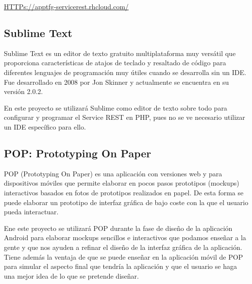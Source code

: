 	\url{HTTPs://apptfg-servicerest.rhcloud.com/}    
    
    \subsection{Sublime Text}\label{ssec:sublime}
    
    Sublime Text \cite{ref:sublime} es un editor de texto gratuito multiplataforma muy versátil que proporciona características de atajos de teclado y resaltado de código para diferentes lenguajes de programación muy útiles cuando se desarrolla sin un IDE. Fue desarrollado en 2008 por Jon Skinner y actualmente se encuentra en su versión 2.0.2.
    
    En este proyecto se utilizará Sublime como editor de texto sobre todo para configurar y programar el Service REST en PHP, pues no se ve necesario utilizar un IDE específico para ello.
    
    \subsection{POP: Prototyping On Paper}\label{ssec:pop}
    
    POP \cite{ref:pop} (Prototyping On Paper) es una aplicación con versiones web y para dispositivos móviles que permite elaborar en pocos pasos prototipos (mockups) interactivos basados en fotos de prototipos realizados en papel. De esta forma se puede elaborar un prototipo de interfaz gráfica de bajo coste con la que el usuario pueda interactuar.
    
    Ene este proyecto se utilizará POP durante la fase de diseño de la aplicación Android para elaborar mockups sencillos e interactivos que podamos enseñar a la gente y que nos ayuden a refinar el diseño de la interfaz gráfica de la aplicación. Tiene además la ventaja de que se puede enseñar en la aplicación móvil de POP para simular el aspecto final que tendría la aplicación y que el usuario se haga una mejor idea de lo que se pretende diseñar.
    